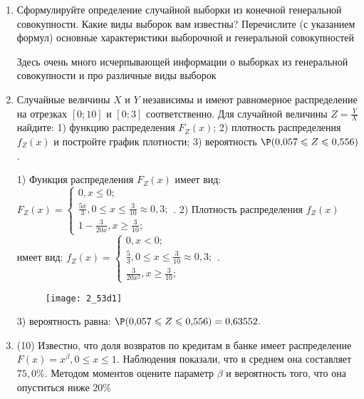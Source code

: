 \documentclass[a4paper,12pt]{article}
\begin{document}
\begin{enumerate}


\item


Сформулируйте определение случайной выборки из конечной генеральной совокупности. Какие
виды выборок вам известны? Перечислите (с указанием формул) основные характеристики выборочной и генеральной совокупностей




Здесь очень много исчерпывающей информации о выборках из генеральной совокупности и про различные виды выборок


\item

Случайные величины $X$ и $Y$ независимы и имеют равномерное
распределение на отрезках $[0;10]$ и $[0;3]$ соответственно. Для случайной величины $Z=\frac{Y}{X}$ найдите: 
1) функцию распределения $F_Z(x)$;
2) плотность распределения $f_Z(x)$ и постройте график плотности;
3) вероятность $\P(0,\!057\leqslant Z\leqslant 0,\!556)$.




1) Функция распределения $F_Z(x)$ имеет вид:
$
F_Z(x)=\left\{
\begin{array}{l}
0, x\leqslant 0;\\
\frac{5 x}{3}, 0\leqslant x\leqslant \frac{3}{10}\approx 0,\!3;\\
1 - \frac{3}{20 x}, x\geqslant\frac{3}{10};
\end{array}.
\right.
$
2) Плотность распределения $f_Z(x)$ имеет вид:
$
f_Z(x)=\left\{
\begin{array}{l}
0, x<0;\\
\frac{5}{3}, 0\leqslant x\leqslant \frac{3}{10}\approx 0,\!3;\\
\frac{3}{20 x^{2}}, x\geqslant\frac{3}{10};
\end{array}.
\right.
$


\begin{figure}[H]
    \texttt{[image: 2\_53d1]}
\end{figure}


3) вероятность равна:
$
\P(0,\!057\leqslant Z\leqslant 0,\!556)=
0,\!63552.
$


\item


(10) Известно, что доля возвратов по кредитам в банке имеет распределение $F(x) = x ^{\beta}, 0 \leqslant x \leqslant 1$.
Наблюдения показали, что в среднем она составляет $75,0\%$. Методом моментов оцените параметр $\beta$ и
вероятность того, что она опуститься ниже $20\%$





\end{enumerate}
\end{document}
